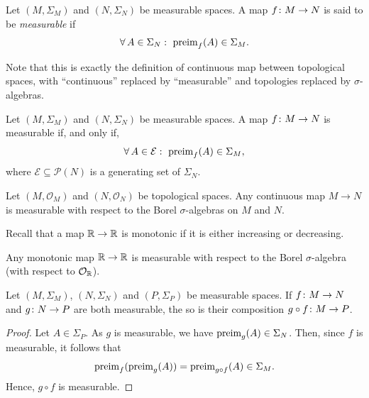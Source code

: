 \begin{definition}
Let $(M,\Sigma_M)$ and $(N,\Sigma_N)$ be measurable spaces. A map $f\colon M\to N$ is said to be \emph{measurable} if
\begin{equation*}
\forall \, A\in \Sigma_N : \ \operatorname{preim}_f(A)\in \Sigma_M.
\end{equation*}
\end{definition}

Note that this is exactly the definition of continuous map between topological spaces, with ``continuous'' replaced by ``measurable'' and topologies replaced by $\sigma$-algebras. 

\begin{lemma}
Let $(M,\Sigma_M)$ and $(N,\Sigma_N)$ be measurable spaces. A map $f\colon M\to N$ is measurable if, and only if,
\begin{equation*}
\forall \, A\in \mathcal{E} : \ \operatorname{preim}_f(A)\in \Sigma_M,
\end{equation*}
where $\mathcal{E}\subseteq\mathscr{P}(N)$ is a generating set of $\Sigma_N$.
\end{lemma}

\begin{corollary}
Let $(M,\mathcal{O}_M)$ and $(N,\mathcal{O}_N)$ be topological spaces. Any continuous map $M\to N$ is measurable with respect to the Borel $\sigma$-algebras on $M$ and $N$.
\end{corollary}

Recall that a map $\mathbb{R}\to\mathbb{R}$ is monotonic if it is either increasing or decreasing.

\begin{corollary}
Any monotonic map $\mathbb{R}\to\mathbb{R}$ is measurable with respect to the Borel $\sigma$-algebra (with respect to $\mathcal{O}_{\mathbb{R}}$).
\end{corollary}

\begin{proposition}
Let $(M,\Sigma_M)$, $(N,\Sigma_N)$ and $(P,\Sigma_P)$ be measurable spaces. If $f\colon M\to N$ and $g\colon N\to P$ are both measurable, the so is their composition $g \circ f\colon M\to P$.
\end{proposition}

\begin{proof}
Let $A\in \Sigma_P$. As $g$ is measurable, we have $\operatorname{preim}_g(A)\in\Sigma_N$. Then, since $f$ is measurable, it follows that
\begin{equation*}
\operatorname{preim}_f(\operatorname{preim}_g(A)) = \operatorname{preim}_{g\circ f}(A) \in \Sigma_M.
\end{equation*}
Hence, $g\circ f$ is measurable.
\end{proof}

